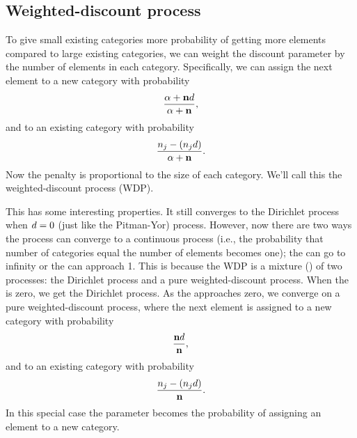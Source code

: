 \subsection{Weighted-discount process}

To give small existing categories more probability of getting more elements
compared to large existing categories, we can weight the discount parameter
by the number of elements in each category. Specifically, 
we can assign the next element to a new category with probability
\begin{equation}
    \frac{\concentration + \numassignedtotal\discount}{\concentration + \numassignedtotal},
    \label{eq:wdprobnew}
\end{equation}
and to an existing category with probability
\begin{equation}
    \frac{\numassigned[\catindex] - (\numassigned[\catindex]\discount)}{\concentration + \numassignedtotal}.
    \label{eq:wdprobexisting}
\end{equation}
Now the penalty is proportional to the size of each category.
We'll call this the weighted-discount process (WDP).

This has some interesting properties.
It still converges to the Dirichlet process when $d = 0$ (just like the
Pitman-Yor) process.
However, now there are two ways the process can converge to a continuous
process (i.e., the probability that number of categories equal the number of
elements becomes one); the \concentration can go to infinity or the
\discount can approach 1.
This is because the WDP is a mixture () of two processes: the Dirichlet process and a
pure weighted-discount process.
When the \discount is zero, we get the Dirichlet process.
As the \concentration approaches zero, we converge on a pure
weighted-discount process, where the next element is assigned to
a new category with probability
\begin{equation}
    \frac{\numassignedtotal\discount}{\numassignedtotal},
    \label{eq:pwdprobnew}
\end{equation}
and to an existing category with probability
\begin{equation}
    \frac{\numassigned[\catindex] - (\numassigned[\catindex]\discount)}{\numassignedtotal}.
    \label{eq:pwdprobexisting}
\end{equation}
In this special case the \discount parameter becomes the probability of
assigning an element to a new category.

